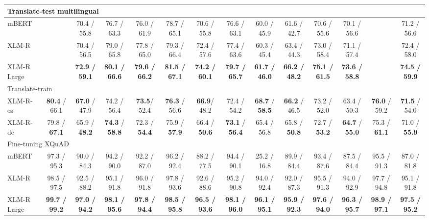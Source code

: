\documentclass[11pt]{article}
\begin{document}
\begin{table*}[!ht]
\begin{adjustbox}{max width=\textwidth}
\begin{tabular}{l|cccccccccccc|c}
        \midrule
        \multicolumn{14}{l}{Translate-test multilingual} \\
        \midrule
        mBERT & ~ & 70.4 / 55.8 & 76.7 / 63.3 & 76.0 / 61.9 & 78.7 / 65.1 & 70.6 / 55.8 & 76.6 / 63.1 & 60.0 / 45.9 & 61.6 / 42.7 & 70.6 / 55.6 & 70.1 / 56.6 & ~ & 71.2 / 56.6 \\
        XLM-R & ~ & 70.4 / 56.5 & 79.0 / 65.8 & 77.8 / 65.0 & 79.3 / 66.4 & 72.4 / 57.6 & 77.4 / 63.6 & 60.3 / 45.4 & 63.4 / 44.3 & 73.0 / 58.4 & 71.1 / 57.4 & ~ & 72.4 / 58.0 \\
        XLM-R Large & ~ &\textbf{72.9 / 59.1}&\textbf{80.1 / 66.6}&\textbf{79.6 / 66.2}&\textbf{81.5 / 67.1}&\textbf{74.2 / 60.1}&\textbf{79.7 / 65.7}&\textbf{61.7 / 46.0}&\textbf{66.2 / 48.2}&\textbf{75.1 / 61.5}&\textbf{73.6 / 58.8}& ~ &\textbf{74.5 / 59.9}\\
        \midrule
        \multicolumn{14}{l}{Translate-train} \\
        \midrule
        XLM-R-es &\textbf{80.4} / 66.1 &\textbf{67.0} / 47.9 & 74.2 / 56.4 &\textbf{73.5}/ 52.4 &\textbf{76.3} / 56.6 &\textbf{66.9}/ 48.2 & 72.4 / 54.2 &\textbf{68.7} / \textbf{58.5} & \textbf{66.2} / 46.5 & 73.2 / 52.0 & 63.4 / 50.3 &\textbf{76.0} / 59.2 &\textbf{71.5} / 54.0 \\
        XLM-R-de & 79.8 / \textbf{67.1}& 65.9 / \textbf{48.2}&\textbf{74.3} / \textbf{58.8}& 72.3 / \textbf{54.4}& 75.9 / \textbf{57.9}& 66.4 / \textbf{50.6}&\textbf{73.1} / \textbf{56.4}& 65.4 / 56.8 & 65.8 / \textbf{50.8}& 72.7 / \textbf{53.2}& \textbf{64.7} / \textbf{55.0}& 75.3 / \textbf{61.1}& 71.0 / \textbf{55.9}\\
        \midrule
        \multicolumn{14}{l}{Fine-tuning XQuAD} \\
        \midrule
        mBERT & 97.3 / 95.3 & 90.0 / 84.3 & 94.2 / 90.0 & 92.2 / 87.0 & 96.2 / 92.4 & 88.2 / 77.5 & 94.4 / 90.1 & 25.2 / 16.8 & 89.9 / 84.4 & 93.4 / 87.6 & 87.5 / 84.4 & 95.5 / 91.3 & 87.0 / 81.8 \\
        XLM-R & 98.5 / 97.5 & 92.5 / 88.2 & 95.1 / 91.8 & 96.0 / 91.8 & 97.8 / 93.6 & 92.6 / 88.6 & 95.2 / 90.8 & 94.0 / 92.4 & 92.0 / 87.3 & 95.5 / 91.3 & 94.0 / 92.9 & 97.7 / 94.8 & 95.1 / 91.8 \\
        XLM-R Large &\textbf{99.7 / 99.2}&\textbf{97.0 / 94.2}&\textbf{98.1 / 95.6}&\textbf{97.8 / 94.4}&\textbf{98.5 / 95.8}&\textbf{96.5 / 93.6}&\textbf{98.1 / 96.0}&\textbf{96.1 / 95.1}&\textbf{95.9 / 92.3}&\textbf{97.6 / 94.0}&\textbf{96.3 / 95.7}&\textbf{98.9 / 97.1}&\textbf{97.5 / 95.2}\\

\end{tabular}
\end{adjustbox}
\end{table*}
\end{document}
